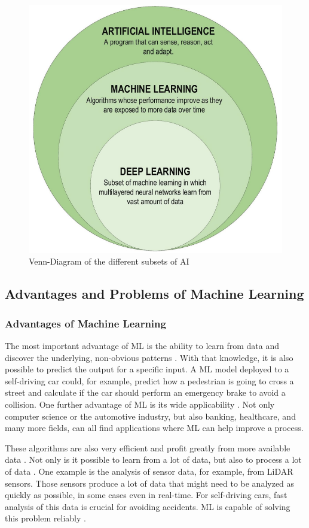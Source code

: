 \begin{figure}[H]
	\centering
	\includegraphics[width=0.7\linewidth]{IMGs/AIMLDL.png}
	\caption{Venn-Diagram of the different subsets of AI \cite{Alzubaidi}}
	\label{fig:AIMLDL}
\end{figure}


\subsection{Advantages and Problems of Machine Learning}\label{Advantages and Problems of Machine Learning}
\subsubsection*{Advantages of Machine Learning}
The most important advantage of ML is the ability to learn from data and discover the underlying, non-obvious patterns \cite{Wuest}. With that knowledge, it is also possible to predict the output for a specific input. A ML model deployed to a self-driving car could, for example, predict how a pedestrian is going to cross a street and calculate if the car should perform an emergency brake to avoid a collision. One further advantage of ML is its wide applicability \cite{Thommandru}. Not only computer science or the automotive industry, but also banking, healthcare, and many more fields, can all find applications where ML can help improve a process.

These algorithms are also very efficient and profit greatly from more available data \cite{Janiesch}. Not only is it possible to learn from a lot of data, but also to process a lot of data \cite{Wuest}. One example is the analysis of sensor data, for example, from LiDAR sensors. Those sensors produce a lot of data that might need to be analyzed as quickly as possible, in some cases even in real-time. For self-driving cars, fast analysis of this data is crucial for avoiding accidents. ML is capable of solving this problem reliably \cite{Lyu}. 

